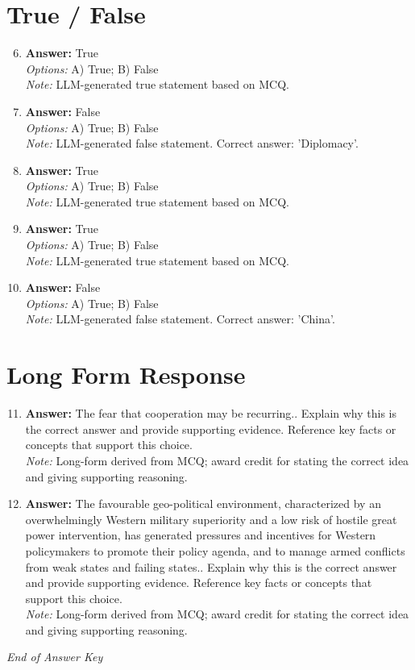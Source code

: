 \documentclass[12pt]{article}
\begin{document}
\section*{True / False}
\begin{enumerate}[label=\arabic*.]
\setcounter{enumi}{5}
\item \textbf{Answer:} True
\\ \textit{Options:} A) True; B) False
\\ \textit{Note:} LLM-generated true statement based on MCQ.
\item \textbf{Answer:} False
\\ \textit{Options:} A) True; B) False
\\ \textit{Note:} LLM-generated false statement. Correct answer: 'Diplomacy'.
\item \textbf{Answer:} True
\\ \textit{Options:} A) True; B) False
\\ \textit{Note:} LLM-generated true statement based on MCQ.
\item \textbf{Answer:} True
\\ \textit{Options:} A) True; B) False
\\ \textit{Note:} LLM-generated true statement based on MCQ.
\item \textbf{Answer:} False
\\ \textit{Options:} A) True; B) False
\\ \textit{Note:} LLM-generated false statement. Correct answer: 'China'.
\end{enumerate}

\section*{Long Form Response}
\begin{enumerate}[label=\arabic*.]
\setcounter{enumi}{10}
\item \textbf{Answer:} The fear that cooperation may be recurring.. Explain why this is the correct answer and provide supporting evidence. Reference key facts or concepts that support this choice.
\\ \textit{Note:} Long-form derived from MCQ; award credit for stating the correct idea and giving supporting reasoning.
\item \textbf{Answer:} The favourable geo-political environment, characterized by an overwhelmingly Western military superiority and a low risk of hostile great power intervention, has generated pressures and incentives for Western policymakers to promote their policy agenda, and to manage armed conflicts from weak states and failing states.. Explain why this is the correct answer and provide supporting evidence. Reference key facts or concepts that support this choice.
\\ \textit{Note:} Long-form derived from MCQ; award credit for stating the correct idea and giving supporting reasoning.
\end{enumerate}

\vfill
\noindent\textit{End of Answer Key}
\end{document}
